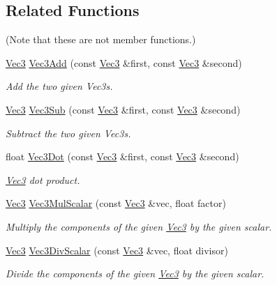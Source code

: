 \subsection*{Related Functions}
(Note that these are not member functions.) {\bf }\par
\begin{DoxyCompactItemize}
\item 
\hyperlink{classgofxmath_1_1_vec3}{Vec3} \hyperlink{classgofxmath_1_1_vec3_ac3979900225f137a1486a4491d0fb6d8}{Vec3\+Add} (const \hyperlink{classgofxmath_1_1_vec3}{Vec3} \&first, const \hyperlink{classgofxmath_1_1_vec3}{Vec3} \&second)
\begin{DoxyCompactList}\small\item\em Add the two given Vec3s. \end{DoxyCompactList}\item 
\hyperlink{classgofxmath_1_1_vec3}{Vec3} \hyperlink{classgofxmath_1_1_vec3_ae7189108aa879fb16ce9afd17052ac16}{Vec3\+Sub} (const \hyperlink{classgofxmath_1_1_vec3}{Vec3} \&first, const \hyperlink{classgofxmath_1_1_vec3}{Vec3} \&second)
\begin{DoxyCompactList}\small\item\em Subtract the two given Vec3s. \end{DoxyCompactList}\item 
float \hyperlink{classgofxmath_1_1_vec3_a02eb26d5238095f747d35890a597e489}{Vec3\+Dot} (const \hyperlink{classgofxmath_1_1_vec3}{Vec3} \&first, const \hyperlink{classgofxmath_1_1_vec3}{Vec3} \&second)
\begin{DoxyCompactList}\small\item\em \hyperlink{classgofxmath_1_1_vec3}{Vec3} dot product. \end{DoxyCompactList}\item 
\hyperlink{classgofxmath_1_1_vec3}{Vec3} \hyperlink{classgofxmath_1_1_vec3_a79475199c50b1ee42edc6aa8b5c5795f}{Vec3\+Mul\+Scalar} (const \hyperlink{classgofxmath_1_1_vec3}{Vec3} \&vec, float factor)
\begin{DoxyCompactList}\small\item\em Multiply the components of the given \hyperlink{classgofxmath_1_1_vec3}{Vec3} by the given scalar. \end{DoxyCompactList}\item 
\hyperlink{classgofxmath_1_1_vec3}{Vec3} \hyperlink{classgofxmath_1_1_vec3_a8c2d0c0b9d70b417e598489374ef1f88}{Vec3\+Div\+Scalar} (const \hyperlink{classgofxmath_1_1_vec3}{Vec3} \&vec, float divisor)
\begin{DoxyCompactList}\small\item\em Divide the components of the given \hyperlink{classgofxmath_1_1_vec3}{Vec3} by the given scalar. \end{DoxyCompactList}\item 

\end{DoxyCompactItemize}
